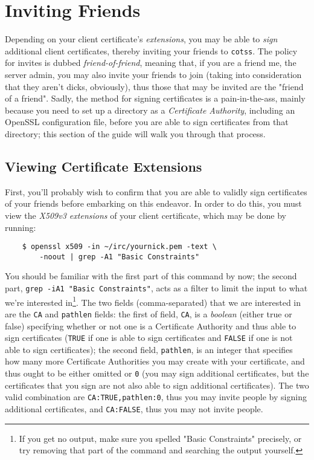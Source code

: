 \documentclass{article}
\begin{document}
{\section{Inviting Friends}
Depending on your client certificate's \textit{extensions}, you may be able to \textit{sign} additional client certificates, thereby inviting your friends to \texttt{cotss}.  The policy for invites is dubbed \textit{friend-of-friend}, meaning that, if you are a friend me, the server admin, you may also invite your friends to join (taking into consideration that they aren't dicks, obviously), thus those that may be invited are the "friend of a friend".  Sadly, the method for signing certificates is a pain-in-the-ass, mainly because you need to set up a directory as a \textit{Certificate Authority}, including an OpenSSL configuration file,  before you are able to sign certificates from that directory; this section of the guide will walk you through that process.

\subsection{Viewing Certificate Extensions}
First, you'll probably wish to confirm that you are able to validly sign certificates of your friends before embarking on this endeavor.  In order to do this, you must view the \textit{X509v3 extensions} of your client certificate, which may be done by running:
\begin{lstlisting}
    $ openssl x509 -in ~/irc/yournick.pem -text \
        -noout | grep -A1 "Basic Constraints"
\end{lstlisting}
You should be familiar with the first part of this command by now; the second part, \texttt{grep -iA1 "Basic Constraints"}, acts as a filter to limit the input to what we're interested in\footnote{If you get no output, make sure you spelled "Basic Constraints" precisely, or try removing that part of the command and searching the output yourself.}.  The two fields (comma-separated) that we are interested in are the \texttt{CA} and \texttt{pathlen} fields: the first of field, \texttt{CA}, is a \textit{boolean} (either true or false) specifying whether or not one is a Certificate Authority and thus able to sign certificates (\texttt{TRUE} if one is able to sign certificates and \texttt{FALSE} if one is not able to sign certificates); the second field, \texttt{pathlen}, is an integer that specifies how many more Certificate Authorities you may create with your certificate, and thus ought to be either omitted or \texttt{0} (you may sign additional certificates, but the certificates that you sign are not also able to sign additional certificates).  The two valid combination are \texttt{CA:TRUE,pathlen:0}, thus you may invite people by signing additional certificates, and \texttt{CA:FALSE}, thus you may not invite people.

}
\end{document}
